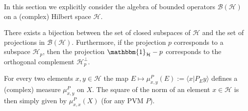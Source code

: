    In this section we explicitly consider the algebra of bounded operators $\mathcal{B}(\mathcal{H})$ on a (complex) Hilbert space $\mathcal{H}$.

    \begin{property}
        There exists a bijection between the set of closed subspaces of $\mathcal{H}$ and the set of projections in $\mathcal{B}(\mathcal{H})$. Furthermore, if the projection $p$ corresponds to a subspace $\mathcal{H}_p$, then the projection $\mathbbm{1}_{\mathcal{H}}-p$ corresponds to the orthogonal complement $\mathcal{H}_p^\perp$.
    \end{property}

    \begin{property}
        For every two elements $x,y\in\mathcal{H}$ the map $E\mapsto\mu^P_{x,y}(E):=\langle x|P_Ey\rangle$ defines a (complex) measure $\mu^P_{x, y}$ on $X$. The square of the norm of an element $x\in\mathcal{H}$ is then simply given by $\mu^P_{x,x}(X)$ (for any PVM $P$).
    \end{property}

